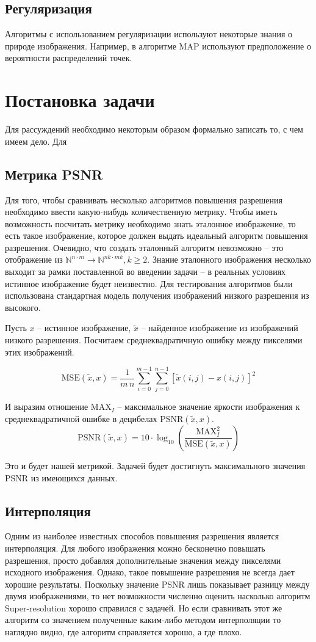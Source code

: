 \subsection{Регуляризация} Алгоритмы с использованием регуляризации используют некоторые знания о природе изображения.
Например, в алгоритме MAP используют предположение о вероятности распределений точек.

\section{Постановка задачи}
Для рассуждений необходимо некоторым образом формально записать то, с чем имеем дело. Для

\subsection{Метрика PSNR}
Для того, чтобы сравнивать несколько алгоритмов повышения разрешения необходимо ввести какую-нибудь количественную
метрику. Чтобы иметь возможность посчитать метрику необходимо знать эталонное изображение, то есть такое изображение,
которое должен выдать идеальный алгоритм повышения разрешения. Очевидно, что создать эталонный алгоритм невозможно --
это отображение из $\mathbb{N}^{n \cdot m } \to \mathbb{N}^{nk \cdot mk}, k \ge 2$. Знание эталонного изображения
несколько выходит за рамки поставленной во введении задачи -- в реальных условиях истинное изображение будет неизвестно.
Для тестирования алгоритмов были использована стандартная модель получения изображений низкого разрешения из высокого.

Пусть $x$ -- истинное изображение, $\tilde{x}$ -- найденное изображение из изображений низкого разрешения. Посчитаем
среднеквадратичную ошибку между пикселями этих изображений.

$$ \mathrm{MSE}(\tilde{x},x) = \frac{1}{m\,n}\sum_{i=0}^{m-1}\sum_{j=0}^{n-1} [\tilde{x}(i,j) - x(i,j)]^2$$

И выразим отношение $\mathrm{MAX}_I$ -- максимальное значение яркости изображения к среднеквадратичной ошибке в
децибелах
$\mathrm{PSNR}(\tilde{x},x)$.
$$ \mathrm{PSNR}(\tilde{x},x) = 10 \cdot \log_{10} \left( \frac{\mathrm{MAX}_I^2}{\mathrm{MSE}(\tilde{x},x)} \right) $$

Это и будет нашей метрикой. Задачей будет достигнуть максимального значения PSNR из имеющихся данных.

\subsection{Интерполяция}
Одним из наиболее известных способов повышения разрешения является интерполяция. Для любого изображения можно бесконечно
повышать разрешения, просто добавляя дополнительные значения между пикселями исходного изображения. Однако, такое
повышение разрешения не всегда дает хорошие результаты. Поскольку значение PSNR лишь показывает разницу между двумя
изображениями, то нет возможности численно оценить насколько алгоритм Super-resolution хорошо справился с задачей. Но
если сравнивать этот же алгоритм со значением полученные каким-либо методом интерполяции то наглядно видно, где алгоритм
справляется хорошо, а где плохо.

